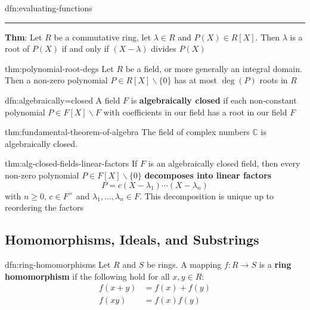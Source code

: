 \documentclass[landscape, 8pt]{extarticle}
\begin{document}
\begin{multicols}{3}
\begin{dfn}{dfn:evaluating-functions}{}
    \noindent\rule{\textwidth}{0.2pt}
    \textbf{Thm}: Let $R$ be a commutative ring, let $\lambda\in R$ and $P(X)\in R[X]$. Then $\lambda$ is a root of $P(X)$ if and only if $(X - \lambda)$ divides $P(X)$
\end{dfn}

\begin{thm}{thm:polynomial-root-degs}{}
    Let $R$ be a field, or more generally an integral domain. Then a non-zero polynomial $P\in R[X] \backslash \{0\}$ has at most $\deg(P)$ roots in $R$
\end{thm}

\begin{dfn}{dfn:algebraically=closed}{}
    A field $F$ is \textbf{algebraically closed} if each non-constant polynomial $P\in F[X]\backslash F$ with coefficients in our field has a root in our field $F$
\end{dfn}

\begin{thm}{thm:fundamental-theorem-of-algebra}{}
    The field of complex numbers $\mathbb{C}$ is algebraically closed.
\end{thm}

\begin{thm}{thm:alg-closed-fields-linear-factors}{}
    If $F$ is an algebraically closed field, then every non-zero polynomial $P\in F[X]\backslash \{0\}$ \textbf{decomposes into linear factors}
    \[P = c(X - \lambda_{1}) \cdots (X - \lambda_{n})\]
    with $n\ge 0,\, c\in F^{\times}$ and $\lambda_{1},\dots,\lambda_{n}\in F$. This decomposition is unique up to reordering the factors
\end{thm}

\subsection{Homomorphisms, Ideals, and Substrings}

\begin{dfn}{dfn:ring-homomorphisms}{}
    Let $R$ and $S$ be rings. A mapping $f : R \to S$ is a \textbf{ring homomorphism} if the following hold for all $x, y\in R$:
    \begin{align*}
        f (x + y) &= f(x) + f(y)\\
        f(xy) &= f(x)f(y)
    \end{align*}
\end{dfn}


\end{multicols}
\end{document}
